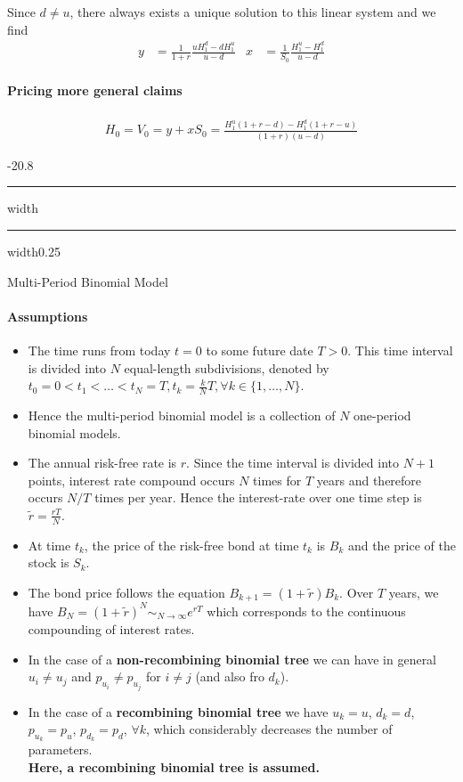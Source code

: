 \documentclass[a4paper,landscape,7pt,fleqn]{scrartcl}
\makeatletter
\renewcommand{\emph}[1]{\textbf{#1}}
\renewcommand{\subsection}{\@startsection{subsection}{1}{0mm}%
{-2\baselineskip}{0.8\baselineskip}%
{\hrule depth 0.2pt width\columnwidth\hrule depth0.75pt
width0.25\columnwidth\vspace*{1.2em}\large\bfseries}}
\makeatother
\begin{document}
\begin{multicols*}{3}
Since $d \neq u$, there always exists a unique solution to this linear system and we find
\begin{align*}
y &= \frac{1}{1+r} \frac{u H_1^d - d H_1^u}{u - d} & x &= \frac{1}{S_0} \frac{H_1^u - H_1^d}{u - d}
\end{align*}

\paragraph{Pricing more general claims}
\begin{align*}
H_0 = V_0 = y + x S_0 = \frac{H_1^u (1+r-d) - H_1^d (1+r-u)}{(1+r)(u-d)}
\end{align*}

\subsection{Multi-Period Binomial Model}

\paragraph{Assumptions}
\begin{itemize}
\item The time runs from today $t=0$ to some future date $T>0$. This time interval is divided into $N$ equal-length subdivisions, denoted by $t_0 = 0 < t_1 < \ldots < t_N = T, t_k = \frac{k}{N} T, \forall k \in \{1, \ldots, N \}$.
\item Hence the multi-period binomial model is a collection of $N$ one-period binomial models.
\item The annual risk-free rate is $r$. Since the time interval is divided into $N+1$ points, interest rate compound occurs $N$ times for $T$ years and therefore occurs $N/T$ times per year. Hence the interest-rate over one time step is $\tilde r = \frac{r T}{N}$.
\item At time $t_k$, the price of the risk-free bond at time $t_k$ is $B_k$ and the price of the stock is $S_k$.
\item The bond price follows the equation $B_{k+1} = (1 + \tilde r) B_k$. Over $T$ years, we have $B_N = (1 + \tilde r)^N \sim_{N \rightarrow \infty} e^{r T}$ which corresponds to the continuous compounding of interest rates.
\item In the case of a \emph{non-recombining binomial tree} we can have in general $u_i \neq u_j$ and $p_{u_i} \neq p_{u_j}$ for $i \neq j$ (and also fro $d_k$).
\item In the case of a \emph{recombining binomial tree} we have $u_k = u$, $d_k = d$, $p_{u_k} = p_u$, $p_{d_k} = p_d$, $\forall k$, which considerably decreases the number of parameters. \\
\emph{Here, a recombining binomial tree is assumed.}
\end{itemize}


\end{multicols*}
\end{document}

